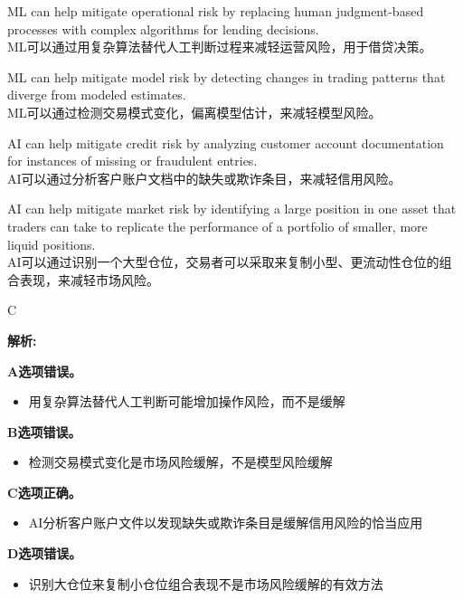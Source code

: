 \documentclass{article}
\newenvironment{explanation}
{\textbf{解析:}\par}
{\par}
\begin{document}
\begin{choices}
    \item ML can help mitigate operational risk by replacing human judgment-based processes with complex algorithms for lending decisions.\\
    ML可以通过用复杂算法替代人工判断过程来减轻运营风险，用于借贷决策。
    \item ML can help mitigate model risk by detecting changes in trading patterns that diverge from modeled estimates.\\
    ML可以通过检测交易模式变化，偏离模型估计，来减轻模型风险。
    \item AI can help mitigate credit risk by analyzing customer account documentation for instances of missing or fraudulent entries.\\
    AI可以通过分析客户账户文档中的缺失或欺诈条目，来减轻信用风险。
    \item AI can help mitigate market risk by identifying a large position in one asset that traders can take to replicate the performance of a portfolio of smaller, more liquid positions.\\
    AI可以通过识别一个大型仓位，交易者可以采取来复制小型、更流动性仓位的组合表现，来减轻市场风险。
\end{choices}

\begin{correctanswer}
    C
\end{correctanswer}

\begin{explanation}
    \textbf{A选项错误。}
    \begin{itemize}
        \item 用复杂算法替代人工判断可能增加操作风险，而不是缓解
    \end{itemize}
    
    \textbf{B选项错误。}
    \begin{itemize}
        \item 检测交易模式变化是市场风险缓解，不是模型风险缓解
    \end{itemize}
    
    \textbf{C选项正确。}
    \begin{itemize}
        \item AI分析客户账户文件以发现缺失或欺诈条目是缓解信用风险的恰当应用
    \end{itemize}
    
    \textbf{D选项错误。}
    \begin{itemize}
        \item 识别大仓位来复制小仓位组合表现不是市场风险缓解的有效方法
    \end{itemize}
\end{explanation}
\end{document}
